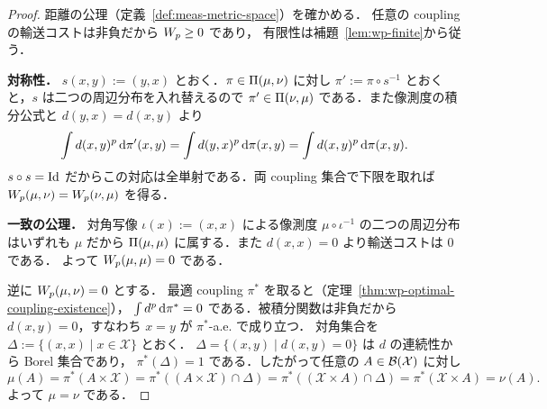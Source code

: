 \begin{proof}
  距離の公理（定義~\ref{def:meas-metric-space}）を確かめる．
  任意の coupling の輸送コストは非負だから $W_p\geq0$ であり，
  有限性は補題~\ref{lem:wp-finite}から従う．

  \textbf{対称性．}
  $s(x,y):=(y,x)$ とおく．$\pi\in\Pi(\mu,\nu)$ に対し
  $\pi':=\pi\circ s^{-1}$ とおくと，$s$ は二つの周辺分布を入れ替えるので
  $\pi'\in\Pi(\nu,\mu)$ である．また像測度の積分公式と
  $d(y,x)=d(x,y)$ より
  \[
    \int d(x,y)^p\,\mathrm{d}\pi'(x,y)
    =\int d(y,x)^p\,\mathrm{d}\pi(x,y)
    =\int d(x,y)^p\,\mathrm{d}\pi(x,y).
  \]
  $s\circ s=\mathrm{Id}$ だからこの対応は全単射である．両 coupling 集合で下限を取れば
  $W_p(\mu,\nu)=W_p(\nu,\mu)$ を得る．

  \textbf{一致の公理．}
  対角写像 $\iota(x):=(x,x)$ による像測度
  $\mu\circ\iota^{-1}$ の二つの周辺分布はいずれも $\mu$ だから
  $\Pi(\mu,\mu)$ に属する．また $d(x,x)=0$ より輸送コストは $0$ である．
  よって $W_p(\mu,\mu)=0$ である．

  逆に $W_p(\mu,\nu)=0$ とする．
  最適 coupling $\pi^*$ を取ると（定理~\ref{thm:wp-optimal-coupling-existence}），
  $\int d^p\,\mathrm{d}\pi^*=0$ である．被積分関数は非負だから
  $d(x,y)=0$，すなわち $x=y$ が $\pi^*$-a.e. で成り立つ．
  対角集合を $\Delta:=\{(x,x)\mid x\in\mathcal{X}\}$ とおく．
  $\Delta=\{(x,y)\mid d(x,y)=0\}$ は $d$ の連続性から Borel 集合であり，
  $\pi^*(\Delta)=1$ である．したがって任意の $A\in\mathcal{B}(\mathcal{X})$ に対し
  \[
    \mu(A)
    =\pi^*(A\times \mathcal{X})
    =\pi^*((A\times\mathcal{X})\cap\Delta)
    =\pi^*((\mathcal{X}\times A)\cap\Delta)
    =\pi^*(\mathcal{X}\times A)
    =\nu(A).
  \]
  よって $\mu=\nu$ である．


\end{proof}
